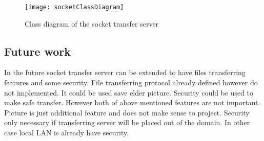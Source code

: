 \begin{figure}[h]
	\centering
		\texttt{[image: socketClassDiagram]}
	\caption{Class diagram of the socket transfer server}
	\label{fig:planning}
\end{figure}


\subsection{Future work}

In the future socket transfer server can be extended to have files transferring features and some security. File transferring protocol already defined however do not implemented. It could be used save elder picture. Security could be used to make safe transfer. However both of above mentioned features are not important. Picture is just additional feature and does not make sense to project. Security only necessary if transferring server will be placed out of the domain. In other case local LAN is already have security.